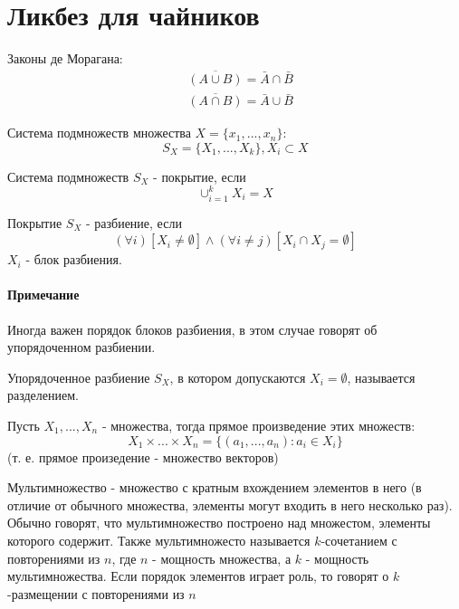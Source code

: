 \section{Ликбез для чайников}

\begin{Def}
	Законы де Морагана:
	\[
		\begin{split}
			& \overline{\left( A \cup B \right)} = \bar A \cap \bar B \\
			& \overline{\left( A \cap B \right)} = \bar A \cup \bar B
		\end{split}
	\] 
\end{Def}

\begin{Def}
	Система подмножеств множества $X = \{x_1, ... , x_n\}$:
	\[
		S_X = \{ X_1, ... , X_k\}, X_i \subset X
	\]
\end{Def}

\begin{Def}
	Система подмножеств $S_X$ - покрытие, если \[ \cup_{i=1}^k X_i = X \]
\end{Def}

\begin{Def}
	Покрытие $S_X$ - разбиение, если \[ \left(\forall i \right) \left[ X_i \not= \emptyset \right] \land \left( \forall i \not= j \right) \left[ X_i \cap X_j = \emptyset \right] \]
	$X_i$ - блок разбиения.
\end{Def}

\paragraph{Примечание}

Иногда важен порядок блоков разбиения, в этом случае говорят об упорядоченном разбиении.

\begin{Def}
	Упорядоченное разбиение $S_X$, в котором допускаются $X_i = \emptyset$, называется разделением.
\end{Def}

\begin{Def}
	Пусть $X_1, ... , X_n$ - множества, тогда прямое произведение этих множеств:
	\[
		X_1 \times ... \times X_n = \{\left( a_1, ... , a_n \right) : a_i \in X_i \}
	\]
	(т. е. прямое произедение - множество векторов)
\end{Def}

\begin{Def}
	Мультимножество - множество с кратным вхождением элементов в него (в отличие от обычного множества, элементы могут входить в него несколько раз).
	Обычно говорят, что мультимножество построено над множестом, элементы которого содержит.
	Также мультимножесто называется $k$-сочетанием с повторениями из $n$, где $n$ - мощность множества, а $k$ - мощность мультимножества.
	Если порядок элементов играет роль, то говорят о $k$-размещении с повторениями из $n$
\end{Def}

